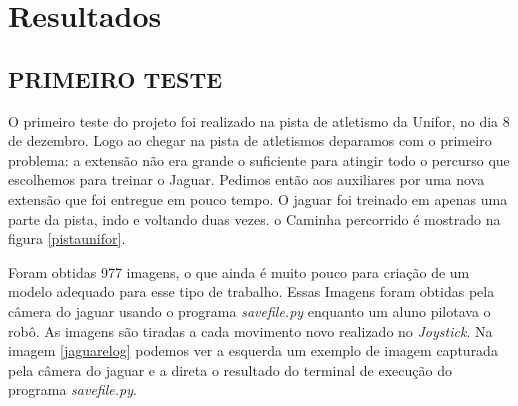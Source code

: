 \chapter{Resultados}
\label{resultados}

\section{PRIMEIRO TESTE}
\label{primeiro_teste}
O primeiro teste do projeto foi realizado na pista de atletismo da Unifor, no dia 8 de dezembro.
Logo ao chegar na pista de atletismos deparamos com o primeiro problema: a extensão não era grande o suficiente para atingir todo o percurso que escolhemos para treinar o Jaguar. Pedimos então aos auxiliares por uma nova extensão que foi entregue em pouco tempo. O jaguar foi treinado em apenas uma parte da pista, indo e voltando duas vezes. o Caminha percorrido é mostrado na figura \ref{pistaunifor}.

	\begin{figure}[H]
		\centering
\end{figure}

Foram obtidas 977 imagens, o que ainda é muito pouco para criação de um modelo adequado para esse tipo de trabalho. Essas Imagens foram obtidas pela câmera do jaguar usando o programa \textit{savefile.py} enquanto um aluno pilotava o robô. As imagens são tiradas a cada movimento novo realizado no \textit{Joystick}. Na imagem \ref{jaguarelog} podemos ver a esquerda um exemplo de imagem capturada pela câmera do jaguar e a direta o resultado do terminal de execução do programa \textit{savefile.py}.

